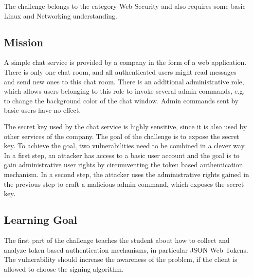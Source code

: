 \documentclass[12pt,a4paper]{article}
\begin{document}
The challenge belongs to the category Web Security and also requires some basic Linux and Networking understanding.

\subsection{Mission}

A simple chat service is provided by a company in the form of a web application. There is only one chat room, and all authenticated users might read messages and send new ones to this chat room. There is an additional administrative role, which allows users belonging to this role to invoke several admin commands, e.g. to change the background color of the chat window. Admin commands sent by basic users have no effect.

The secret key used by the chat service is  highly sensitive, since it is also used by other services of the company. The goal of the challenge is to expose the secret key.
To achieve the goal, two vulnerabilities need to be combined in a clever way.
In a first step, an attacker has access to a basic user account and the goal is to gain administrative user rights by circumventing the token based authentication mechanism.
In a second step, the attacker uses the administrative rights gained in the previous step to craft a malicious admin command, which exposes the secret key.


\subsection{Learning Goal}

The first part of the challenge teaches the student about how to collect and analyze token based authentication mechanisms, in particular JSON Web Tokens. The vulnerability should increase the awareness of the problem, if the client is allowed to choose the signing algorithm.
\end{document}
